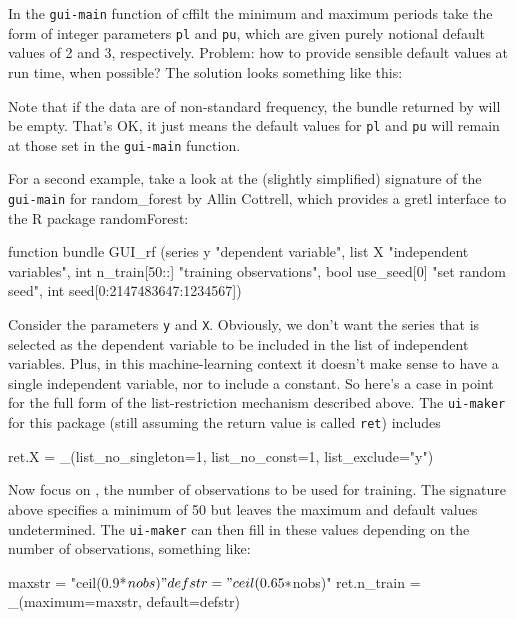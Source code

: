 \documentclass[oneside]{book}
\begin{document}
In the \texttt{gui-main} function of \textsf{cffilt} the minimum and
maximum periods take the form of integer parameters \texttt{pl} and
\texttt{pu}, which are given purely notional default values of 2 and
3, respectively. Problem: how to provide sensible default values at
run time, when possible? The solution looks something like this:


Note that if the data are of non-standard frequency, the bundle
returned by  will be empty. That's OK, it just
means the default values for \texttt{pl} and \texttt{pu} will remain
at those set in the \texttt{gui-main} function.

For a second example, take a look at the (slightly simplified)
signature of the \texttt{gui-main} for \textsf{random\_forest} by
Allin Cottrell, which provides a gretl interface to the \textsf{R}
package \textsf{randomForest}:
\begin{code}
function bundle GUI_rf (series y "dependent variable",
   list X "independent variables",
   int n_train[50::] "training observations",
   bool use_seed[0] "set random seed",
   int seed[0:2147483647:1234567])
\end{code}

Consider the parameters \texttt{y} and \texttt{X}. Obviously, we don't
want the series that is selected as the dependent variable to be
included in the list of independent variables. Plus, in this
machine-learning context it doesn't make sense to have a single
independent variable, nor to include a constant. So here's a case in
point for the full form of the list-restriction mechanism described
above.  The \texttt{ui-maker} for this package (still assuming the
return value is called \texttt{ret}) includes
\begin{code}
ret.X = _(list_no_singleton=1, list_no_const=1, list_exclude="y")
\end{code}

Now focus on , the number of observations to be used
for training. The signature above specifies a minimum of 50 but leaves
the maximum and default values undetermined. The \texttt{ui-maker} can
then fill in these values depending on the number of observations,
something like:
\begin{code}
maxstr = "ceil(0.9*$nobs)"
defstr = "ceil(0.65*$nobs)"
ret.n_train = _(maximum=maxstr, default=defstr)
\end{code}
\end{document}
